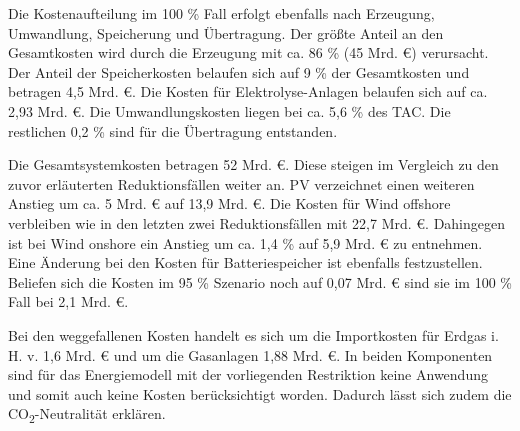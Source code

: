 Die Kostenaufteilung im 100 \% Fall erfolgt ebenfalls nach Erzeugung, Umwandlung, Speicherung und Übertragung. Der größte Anteil an den Gesamtkosten wird durch die Erzeugung mit ca. 86 \% (45 Mrd. €) verursacht. Der Anteil der Speicherkosten belaufen sich auf 9 \% der Gesamtkosten und betragen 4,5 Mrd. €. Die Kosten für Elektrolyse-Anlagen belaufen sich auf ca. 2,93 Mrd. €. Die Umwandlungskosten liegen bei ca. 5,6 \% des TAC. Die restlichen 0,2 \% sind für die Übertragung entstanden. 

Die Gesamtsystemkosten betragen 52 Mrd. €. Diese steigen im Vergleich zu den zuvor erläuterten Reduktionsfällen weiter an. PV verzeichnet einen weiteren Anstieg um ca. 5 Mrd. € auf 13,9 Mrd. €. Die Kosten für Wind offshore verbleiben wie in den letzten zwei Reduktionsfällen mit 22,7 Mrd. €. Dahingegen ist bei Wind onshore ein Anstieg um ca. 1,4 \% auf 5,9 Mrd. € zu entnehmen. Eine Änderung bei den Kosten für Batteriespeicher ist ebenfalls festzustellen. Beliefen sich die Kosten im 95 \% Szenario noch auf 0,07 Mrd. € sind sie im 100 \% Fall bei 2,1 Mrd. €. 

Bei den weggefallenen Kosten handelt es sich um die Importkosten für Erdgas i. H. v. 1,6 Mrd. € und um die Gasanlagen 1,88 Mrd. €. In beiden Komponenten sind für das Energiemodell mit der vorliegenden Restriktion keine Anwendung und somit auch keine Kosten berücksichtigt worden. Dadurch lässt sich zudem die CO\textsubscript{2}-Neutralität erklären.

